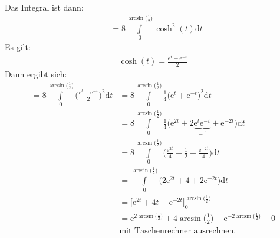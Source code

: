 Das Integral ist dann:\\
\begin{align*}
&=8\int\limits_{0}^{\arcsin\big(\frac{1}{2}\big)} \cosh^2(t)\mathrm{d}t
\end{align*}
Es gilt:\\
\begin{align*}
\cosh(t)=\frac{\mathrm{e}^t+\mathrm{e}^{-t}}{2}
\end{align*}
Dann ergibt sich:\\
\begin{align*}
=8\int\limits_{0}^{\arcsin\big(\frac{1}{2}\big)}\bigg(\frac{e^t+\mathrm{e}^{-t}}{2}\bigg )^2 \mathrm{d}t&=8\int\limits_{0}^{\arcsin\big(\frac{1}{2}\big)}\frac{1}{4}\bigg(\mathrm{e}^t+\mathrm{e}^{-t}\bigg )^2\mathrm{d}t\\
&=8\int\limits_{0}^{\arcsin\big(\frac{1}{2}\big)}\frac{1}{4}\big(\mathrm{e}^{2t}+2\underbrace {\mathrm{e}^t\mathrm{e}^{-t}}_{=1}+\mathrm{e}^{-2t}\big)\mathrm{d}t\\
&=8\int\limits_{0}^{\arcsin\big(\frac{1}{2}\big)}\bigg(\frac{\mathrm{e}^{2t}}{4}+\frac{1}{2}+\frac{\mathrm{e}^{-2t}}{4}\bigg)\mathrm{d}t\\
&=\int\limits_{0}^{\arcsin\big(\frac{1}{2}\big)}\big(2\mathrm{e}^{2t}+4+2\mathrm{e}^{-2t}\big)\mathrm{d}t\\
&=\bigg[\mathrm{e}^{2t}+4t-\mathrm{e}^{-2t}\bigg]^{\arcsin\big(\frac{1}{2}\big)}_0\\
&=\mathrm{e}^{2\arcsin\big(\frac{1}{2}\big)}+4\arcsin\bigg(\frac{1}{2}\bigg)-\mathrm{e}^{-2\arcsin\big(\frac{1}{2}\big)}-0\\
&\text{mit Taschenrechner ausrechnen. }
\end{align*}
